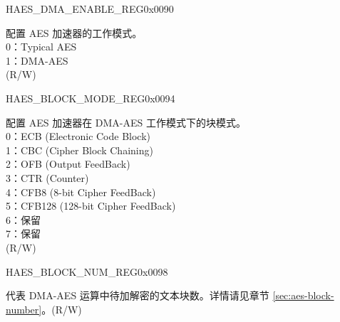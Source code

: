 \begin{register}{H}{AES\_DMA\_ENABLE\_REG}{0x0090}\label{regdesc:AESDMAENABLEREG}
%
%
\regnewline%
\begin{regdesc}\begin{reglist}
\item [AES\_DMA\_ENABLE] 配置 AES 加速器的工作模式。\\
0：Typical AES\\
1：DMA-AES\\
(R/W)
\end{reglist}\end{regdesc}
\end{register}


\begin{register}{H}{AES\_BLOCK\_MODE\_REG}{0x0094}\label{regdesc:AESBLOCKMODEREG}
%
%
\regnewline%
\begin{regdesc}\begin{reglist}
\item [AES\_BLOCK\_MODE] 配置 AES 加速器在 DMA-AES 工作模式下的块模式。\\
0：ECB (Electronic Code Block)\\
1：CBC (Cipher Block Chaining)\\
2：OFB (Output FeedBack)\\
3：CTR (Counter)\\
4：CFB8 (8-bit Cipher FeedBack)\\
5：CFB128 (128-bit Cipher FeedBack)\\
6：保留\\
7：保留\\
(R/W)
\end{reglist}\end{regdesc}
\end{register}


\begin{register}{H}{AES\_BLOCK\_NUM\_REG}{0x0098}\label{regdesc:AESBLOCKNUMREG}
%
\regnewline%
\begin{regdesc}\begin{reglist}
\item [AES\_BLOCK\_NUM] 代表 DMA-AES 运算中待加解密的文本块数。详情请见章节 \ref{sec:aes-block-number}。(R/W)
\end{reglist}\end{regdesc}
\end{register}


